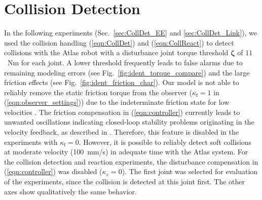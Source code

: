 \section{\large Collision Detection}
\label{sec:CollDet}
%
In the following experiments (Sec.~\ref{sec:CollDet_EE} and \ref{sec:CollDet_Link}), we used the collision handling (\ref{eqn:CollDet}) and (\ref{eqn:CollReact}) to detect collisions with the Atlas robot with a disturbance joint torque threshold  $\bm{\zeta}$ of $11$~Nm for each joint.
A lower threshold frequently leads to false alarms due to remaining modeling errors (see Fig.~\ref{fig:ident_torque_compare}) and the large friction effects (see Fig.~\ref{fig:ident_friction_char}).
Our model is not able to reliably remove the static friction torque from the observer ($\kappa_{\mathrm{f}}=1$ in (\ref{eqn:observer_settings})) due to the indeterminate friction state for low velocities \cite{BidardLibArhMea2005}.
The friction compensation in (\ref{eqn:controller}) currently leads to unwanted oscillations indicating closed-loop stability problems originating in the velocity feedback, as described in \cite{ConnerKohRomStu2015}.
Therefore, this feature is disabled in the experiments with $\kappa_{\mathrm{f}}=0$. 
However, it is possible to reliably detect soft collisions at moderate velocity (100~mm/s) in adequate time with the Atlas system.
For the collision detection and reaction experiments, the disturbance compensation in (\ref{eqn:controller}) was disabled ($\kappa_\varepsilon=0$).
The first joint was selected for evaluation of the experiments, since the collision is detected at this joint first. The other axes show qualitatively the same behavior.

